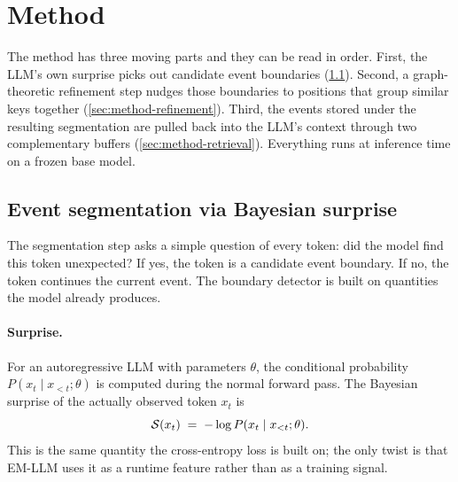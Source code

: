 \section{Method}
\label{sec:method}

The method has three moving parts and they can be read in order. First, the LLM's own surprise picks out candidate event boundaries (\cref{sec:method-segmentation}). Second, a graph-theoretic refinement step nudges those boundaries to positions that group similar keys together (\cref{sec:method-refinement}). Third, the events stored under the resulting segmentation are pulled back into the LLM's context through two complementary buffers (\cref{sec:method-retrieval}). Everything runs at inference time on a frozen base model.

\subsection{Event segmentation via Bayesian surprise}
\label{sec:method-segmentation}

The segmentation step asks a simple question of every token: did the model find this token unexpected? If yes, the token is a candidate event boundary. If no, the token continues the current event. The boundary detector is built on quantities the model already produces.

\paragraph{Surprise.}
For an autoregressive LLM with parameters $\theta$, the conditional probability $P(x_t \mid x_{<t}; \theta)$ is computed during the normal forward pass. The Bayesian surprise of the actually observed token $x_t$ is
\begin{equation}
  \mathcal{S}(x_t) \;=\; -\log P(x_t \mid x_{<t}; \theta).
  \label{eq:surprise}
\end{equation}
This is the same quantity the cross-entropy loss is built on; the only twist is that EM-LLM uses it as a runtime feature rather than as a training signal.

